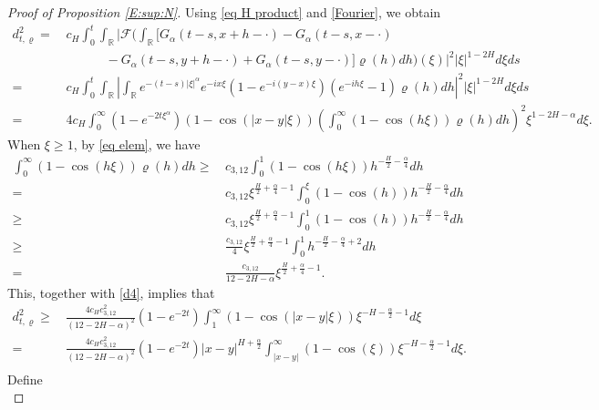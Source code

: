 \documentclass[11pt,reqno]{amsart}
\numberwithin{equation}{section}
\def\RR{\mathbb{R}}
\newcommand{\1}{{\bf 1}}
\newcommand{\2}{{\bf 2}}
\begin{document}
\begin{proof}[Proof of  Proposition \ref{E:sup:N}]
Using \eqref{eq H product} and \eqref{Fourier}, we obtain
\begin{equation}\label{d4}
\begin{split}
 d^2_{t,\varrho}
=&\, c_{H}\int_0^t \int_{\RR}\Big| \mathcal F \Big(\int_{\RR}[G_\alpha(t-s,x+h-\cdot)-G_\alpha(t-s,x-\cdot)\\
&\,\ \ \ \ \ \ \ \ \ \ \ \ \ \    -G_\alpha(t-s,y+h-\cdot)+G_\alpha(t-s,y-\cdot)]
 \varrho(h)dh \Big)(\xi)\Big|^2 |\xi|^{1-2H}d\xi ds\\
=&\, c_{H}\int_0^t \int_{\RR}\left| \int_{\RR}
e^{-(t-s)|\xi|^\alpha}e^{-ix\xi}\left(1-e^{-i(y-x)\xi}\right)\left(e^{-ih\xi}-1\right)\varrho(h)dh\right|^2
|\xi|^{1-2H}d\xi ds\\
=&\, 4c_{H}\int_0^\infty\left(1-e^{-2t\xi^\alpha}\right)(1-\cos(|x-y|\xi))
\left(\int_0^\infty(1-\cos(h\xi))\varrho(h)dh\right)^2\xi^{1-2H-\alpha}d\xi.
\end{split}
\end{equation}
When $\xi\geq1$, by \eqref{eq elem}, we have
\begin{equation}\label{d4-2}
\begin{split}
\int_0^\infty(1-\cos(h\xi))\varrho(h)dh
\geq&\, c_{3,12}\int_0^1 (1-\cos(h\xi))h^{-\frac{H}2-\frac\alpha4}dh\\
=&\, c_{3,12}\xi^{\frac{H}2+\frac\alpha4-1}\int_0^{\xi}(1-\cos(h))h^{-\frac{H}2-\frac\alpha4}dh\\
\geq&\, c_{3,12}\xi^{\frac{H}2+\frac\alpha4-1}\int_0^1(1-\cos(h))h^{-\frac{H}2-\frac\alpha4}dh\\
\geq&\, \frac{c_{3,12}}{4}\xi^{\frac{H}2+\frac\alpha4-1}\int_0^1h^{-\frac{H}2-\frac\alpha4+2}dh\\
=&\, \frac{c_{3,12}}{12-2H-\alpha}\xi^{\frac{H}2+\frac\alpha4-1}.
\end{split}
\end{equation}
This, together with \eqref{d4}, implies that
\begin{equation}\label{d4:lower}
\begin{split}
d^2_{t,\varrho}
 \geq&\,  \frac{4c_{H}c_{3,12}^2}{(12-2H-\alpha)^2}\left(1-e^{-2t}\right)
\int_1^\infty (1-\cos(|x-y|\xi))\xi^{-H-\frac{\alpha}2-1}d\xi\\
=&\, \frac{4c_{H}c_{3,12}^2}{(12-2H-\alpha)^2}\left(1-e^{-2t}\right)|x-y|^{H+\frac{\alpha}2}
    \int_{|x-y|}^\infty(1-\cos(\xi))
      \xi^{-H-\frac{\alpha}2-1}d\xi.\\
\end{split}
\end{equation}
Define
\begin{equation}\label{k3}

\end{equation}
\end{proof}
\end{document}
